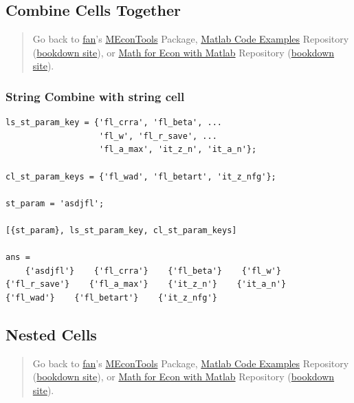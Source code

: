 \documentclass[
]{book}
\begin{document}
\hypertarget{combine-cells-together}{%
\subsection{Combine Cells Together}\label{combine-cells-together}}

\begin{quote}
Go back to \href{http://fanwangecon.github.io/}{fan}'s \href{https://fanwangecon.github.io/MEconTools/}{MEconTools} Package, \href{https://fanwangecon.github.io/M4Econ/}{Matlab Code Examples} Repository (\href{https://fanwangecon.github.io/M4Econ/bookdown}{bookdown site}), or \href{https://fanwangecon.github.io/Math4Econ/}{Math for Econ with Matlab} Repository (\href{https://fanwangecon.github.io/Math4Econ/bookdown}{bookdown site}).
\end{quote}

\hypertarget{string-combine-with-string-cell}{%
\subsubsection{String Combine with string cell}\label{string-combine-with-string-cell}}

\begin{verbatim}
ls_st_param_key = {'fl_crra', 'fl_beta', ...
                   'fl_w', 'fl_r_save', ...
                   'fl_a_max', 'it_z_n', 'it_a_n'};

cl_st_param_keys = {'fl_wad', 'fl_betart', 'it_z_nfg'};

st_param = 'asdjfl';

[{st_param}, ls_st_param_key, cl_st_param_keys]

ans = 
    {'asdjfl'}    {'fl_crra'}    {'fl_beta'}    {'fl_w'}    {'fl_r_save'}    {'fl_a_max'}    {'it_z_n'}    {'it_a_n'}    {'fl_wad'}    {'fl_betart'}    {'it_z_nfg'}
\end{verbatim}

\hypertarget{nested-cells}{%
\subsection{Nested Cells}\label{nested-cells}}

\begin{quote}
Go back to \href{http://fanwangecon.github.io/}{fan}'s \href{https://fanwangecon.github.io/MEconTools/}{MEconTools} Package, \href{https://fanwangecon.github.io/M4Econ/}{Matlab Code Examples} Repository (\href{https://fanwangecon.github.io/M4Econ/bookdown}{bookdown site}), or \href{https://fanwangecon.github.io/Math4Econ/}{Math for Econ with Matlab} Repository (\href{https://fanwangecon.github.io/Math4Econ/bookdown}{bookdown site}).
\end{quote}
\end{document}
